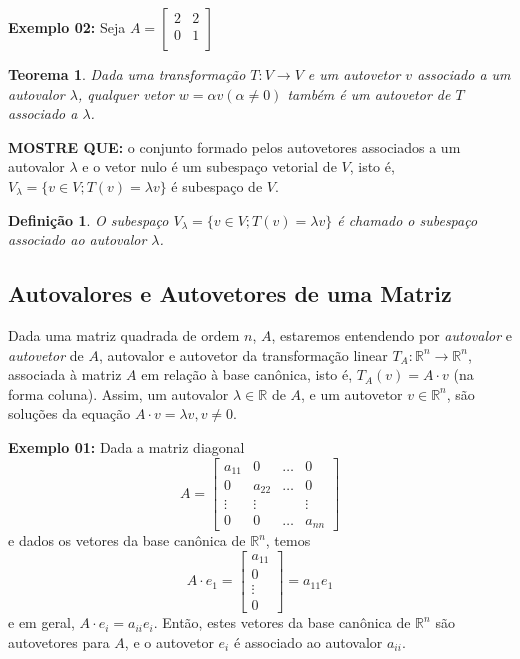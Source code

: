 \documentclass[oneside,a4paper,12pt]{article}
\newtheorem{theorem}{Teorema}[section]
\newtheorem{definition}{Definição}[section]
\begin{document}
{\bf Exemplo 02: } Seja $A = \left[
\begin{array}{cc}
2	&	2\\
0	&	1 \\
\end{array}
\right]$
\vspace{400pt}

\begin{theorem}
	Dada uma transformação $T:V \rightarrow V$ e um autovetor $v$ associado a um autovalor $\lambda$, qualquer vetor $w = \alpha v (\alpha \neq 0)$ também é um autovetor de $T$ associado a $\lambda$.
\end{theorem}

{\bf MOSTRE QUE:} o conjunto formado pelos autovetores associados a um autovalor $\lambda$ e o vetor nulo é um subespaço vetorial de $V$, isto é, $V_\lambda = \{ v \in V; T(v) = \lambda v \}$ é subespaço de $V$.

\begin{definition}
	O subespaço $V_\lambda = \{ v \in V; T(v) = \lambda v \}$ é chamado o \emph{subespaço associado ao autovalor} $\lambda$.
\end{definition}

\subsection{Autovalores e Autovetores de uma Matriz}

Dada uma matriz quadrada de ordem $n$, $A$, estaremos entendendo por \emph{autovalor} e \emph{autovetor} de $A$, autovalor e autovetor da transformação linear $T_A:\mathbb{R}^n \rightarrow \mathbb{R}^n$, associada à matriz $A$ em relação à base canônica, isto é, $T_A (v) = A \cdot v$ (na forma coluna). Assim, um autovalor $\lambda \in \mathbb{R}$ de $A$, e um autovetor $v \in \mathbb{R}^n$, são soluções da equação $A \cdot v = \lambda v, v \neq 0$.

{\bf Exemplo 01:} Dada a matriz diagonal
$$A = \left[
\begin{array}{cccc}
a_{11}	&	0		&	\dots	&	0\\
0		&	a_{22}	&	\dots	&	0 \\
\vdots	&	\vdots	&			&	\vdots	\\
0		&	0		&	\dots	&	a_{nn}
\end{array}
\right]$$
e dados os vetores da base canônica de $\mathbb{R}^n$, temos
$$A \cdot e_1 = \left[
\begin{array}{c}
a_{11}\\
0 \\
\vdots \\
0
\end{array}
\right] = a_{11}e_1$$
e em geral, $A \cdot e_i = a_{ii}e_i$. Então, estes vetores da base canônica de $\mathbb{R}^n$ são autovetores para $A$, e o autovetor $e_i$ é associado ao autovalor $a_{ii}$.
\end{document}
